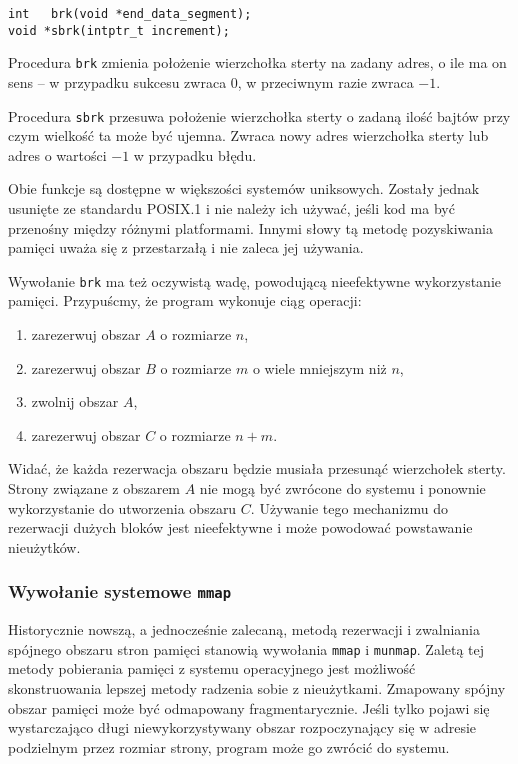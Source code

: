 \documentclass[12pt,a4paper,titlepage,twoside]{mwart}
\begin{document}
\begin{lstlisting}[caption={Prototypy procedur \texttt{brk} i \texttt{sbrk}.}]
int   brk(void *end_data_segment);
void *sbrk(intptr_t increment);
\end{lstlisting}

Procedura \texttt{brk} zmienia położenie wierzchołka sterty na zadany adres, o
ile ma on sens -- w przypadku sukcesu zwraca $0$, w przeciwnym razie zwraca $-1$.

Procedura \texttt{sbrk} przesuwa położenie wierzchołka sterty o zadaną ilość
bajtów przy czym wielkość ta może być ujemna. Zwraca nowy adres wierzchołka
sterty lub adres o wartości $-1$ w przypadku błędu.

Obie funkcje są dostępne w większości systemów uniksowych. Zostały jednak
usunięte ze standardu POSIX.1 i nie należy ich używać, jeśli kod ma być
przenośny między różnymi platformami. Innymi słowy tą metodę pozyskiwania
pamięci uważa się z przestarzałą i nie zaleca jej używania.

Wywołanie \texttt{brk} ma też oczywistą wadę, powodującą nieefektywne
wykorzystanie pamięci. Przypuścmy, że program wykonuje ciąg operacji:

\begin{enumerate}
\item zarezerwuj obszar $A$ o rozmiarze $n$,
\item zarezerwuj obszar $B$ o rozmiarze $m$ o wiele mniejszym niż $n$,
\item zwolnij obszar $A$,
\item zarezerwuj obszar $C$ o rozmiarze $n + m$.
\end{enumerate}

Widać, że każda rezerwacja obszaru będzie musiała przesunąć wierzchołek sterty.
Strony związane z obszarem $A$ nie mogą być zwrócone do systemu i ponownie
wykorzystanie do utworzenia obszaru $C$. Używanie tego mechanizmu do rezerwacji
dużych bloków jest nieefektywne i może powodować powstawanie nieużytków.

\subsubsection{Wywołanie systemowe \texttt{mmap}}

Historycznie nowszą, a jednocześnie zalecaną, metodą rezerwacji i zwalniania
spójnego obszaru stron pamięci stanowią wywołania \texttt{mmap} i
\texttt{munmap}. Zaletą tej metody pobierania pamięci z systemu operacyjnego
jest możliwość skonstruowania lepszej metody radzenia sobie z nieużytkami.
Zmapowany spójny obszar pamięci może być odmapowany fragmentarycznie. Jeśli
tylko pojawi się wystarczająco długi niewykorzystywany obszar rozpoczynający
się w adresie podzielnym przez rozmiar strony, program może go zwrócić do
systemu. 
\end{document}
